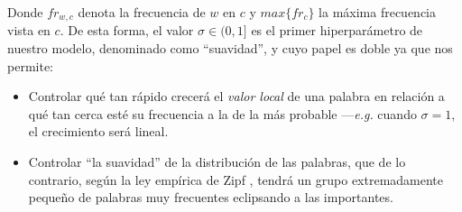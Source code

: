 Donde $fr_{w, c}$ denota la frecuencia de $w$ en $c$ y $max\{fr_c\}$ la máxima frecuencia vista en $c$. De esta forma, el valor $\sigma\in(0, 1]$ es el primer hiperparámetro de nuestro modelo, denominado como ``suavidad'', y cuyo papel es doble ya que nos permite:
\begin{itemize}
    \item Controlar qué tan rápido crecerá el \emph{valor local} de una palabra en relación a qué tan cerca esté su frecuencia a la de la más probable ---\emph{e.g.} cuando $\sigma = 1$, el crecimiento será lineal. %
    \item Controlar ``la suavidad'' de la distribución de las palabras, que de lo contrario, según la ley empírica de Zipf \cite{zipf1949human, powers1998applications}, tendrá un grupo extremadamente pequeño de palabras muy frecuentes eclipsando a las importantes.
\end{itemize}

